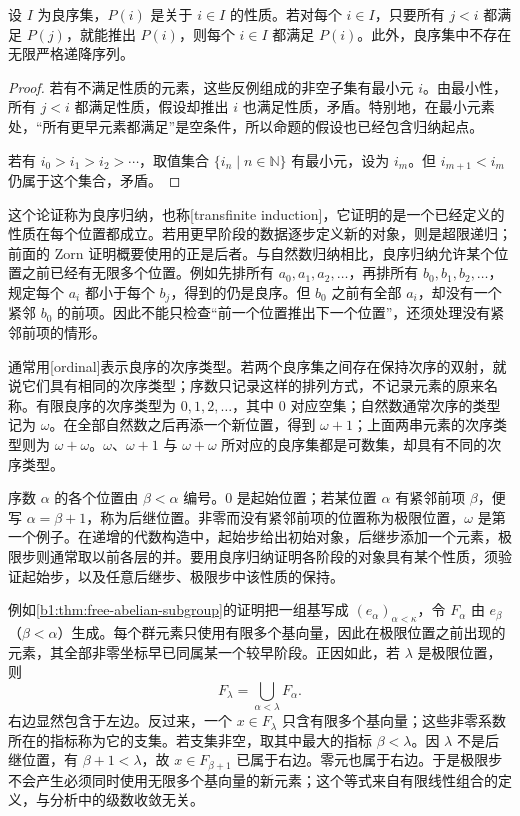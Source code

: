 \begin{proposition}\label{b1:prop:well-order-induction}
	设 \(I\) 为良序集，\(P(i)\) 是关于 \(i\in I\) 的性质。若对每个 \(i\in I\)，只要所有 \(j<i\) 都满足 \(P(j)\)，就能推出 \(P(i)\)，则每个 \(i\in I\) 都满足 \(P(i)\)。此外，良序集中不存在无限严格递降序列。
\end{proposition}

\begin{proof}
	若有不满足性质的元素，这些反例组成的非空子集有最小元 \(i\)。由最小性，所有 \(j<i\) 都满足性质，假设却推出 \(i\) 也满足性质，矛盾。特别地，在最小元素处，“所有更早元素都满足”是空条件，所以命题的假设也已经包含归纳起点。

	若有 \(i_0>i_1>i_2>\cdots\)，取值集合 \(\{i_n\mid n\in\mathbb N\}\) 有最小元，设为 \(i_m\)。但 \(i_{m+1}<i_m\) 仍属于这个集合，矛盾。
\end{proof}

这个论证称为良序归纳，也称[transfinite induction]，它证明的是一个已经定义的性质在每个位置都成立。若用更早阶段的数据逐步定义新的对象，则是超限递归；前面的 Zorn 证明概要使用的正是后者。与自然数归纳相比，良序归纳允许某个位置之前已经有无限多个位置。例如先排所有 \(a_0,a_1,a_2,\ldots\)，再排所有 \(b_0,b_1,b_2,\ldots\)，规定每个 \(a_i\) 都小于每个 \(b_j\)，得到的仍是良序。但 \(b_0\) 之前有全部 \(a_i\)，却没有一个紧邻 \(b_0\) 的前项。因此不能只检查“前一个位置推出下一个位置”，还须处理没有紧邻前项的情形。

\ProseParagraphBreak
通常用[ordinal]表示良序的次序类型。若两个良序集之间存在保持次序的双射，就说它们具有相同的次序类型；序数只记录这样的排列方式，不记录元素的原来名称。有限良序的次序类型为 \(0,1,2,\ldots\)，其中 \(0\) 对应空集；自然数通常次序的类型记为 \(\omega\)。在全部自然数之后再添一个新位置，得到 \(\omega+1\)；上面两串元素的次序类型则为 \(\omega+\omega\)。\(\omega\)、\(\omega+1\) 与 \(\omega+\omega\) 所对应的良序集都是可数集，却具有不同的次序类型。

\ProseParagraphBreak
序数 \(\alpha\) 的各个位置由 \(\beta<\alpha\) 编号。\(0\) 是起始位置；若某位置 \(\alpha\) 有紧邻前项 \(\beta\)，便写 \(\alpha=\beta+1\)，称为后继位置。非零而没有紧邻前项的位置称为极限位置，\(\omega\) 是第一个例子。在递增的代数构造中，起始步给出初始对象，后继步添加一个元素，极限步则通常取以前各层的并。要用良序归纳证明各阶段的对象具有某个性质，须验证起始步，以及任意后继步、极限步中该性质的保持。

\ProseParagraphBreak
例如\cref{b1:thm:free-abelian-subgroup}的证明把一组基写成 \((e_\alpha)_{\alpha<\kappa}\)，令 \(F_\alpha\) 由 \(e_\beta\)（\(\beta<\alpha\)）生成。每个群元素只使用有限多个基向量，因此在极限位置之前出现的元素，其全部非零坐标早已同属某一个较早阶段。正因如此，若 \(\lambda\) 是极限位置，则
\[
	F_\lambda=\bigcup_{\alpha<\lambda}F_\alpha.
\]
右边显然包含于左边。反过来，一个 \(x\in F_\lambda\) 只含有限多个基向量；这些非零系数所在的指标称为它的支集。若支集非空，取其中最大的指标 \(\beta<\lambda\)。因 \(\lambda\) 不是后继位置，有 \(\beta+1<\lambda\)，故 \(x\in F_{\beta+1}\) 已属于右边。零元也属于右边。于是极限步不会产生必须同时使用无限多个基向量的新元素；这个等式来自有限线性组合的定义，与分析中的级数收敛无关。


